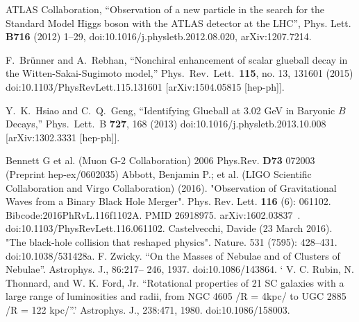 \begin{thebibliography}{9}
 ATLAS Collaboration,
  “Observation of a new particle in the search for the Standard Model Higgs boson with the ATLAS detector at the LHC”, 
 Phys. Lett. {\bf B716} (2012) 1–29, doi:10.1016/j.physletb.2012.08.020, arXiv:1207.7214.
 
 F.~Brünner and A.~Rebhan,
  ``Nonchiral enhancement of scalar glueball decay in the Witten-Sakai-Sugimoto model,''
  Phys.\ Rev.\ Lett.\  {\bf 115}, no. 13, 131601 (2015)
  doi:10.1103/PhysRevLett.115.131601
  [arXiv:1504.05815 [hep-ph]].
  
 Y.~K.~Hsiao and C.~Q.~Geng,
  ``Identifying Glueball at 3.02 GeV in Baryonic $B$ Decays,''
  Phys.\ Lett.\ B {\bf 727}, 168 (2013)
  doi:10.1016/j.physletb.2013.10.008
  [arXiv:1302.3331 [hep-ph]].
  
 Bennett G et al. 
 (Muon G-2 Collaboration) 2006 Phys.Rev. {\bf D73} 072003 
 (Preprint hep-ex/0602035)
Abbott, Benjamin P.; et al. (LIGO Scientific Collaboration and Virgo Collaboration) (2016). 
"Observation of Gravitational Waves from a Binary Black Hole Merger". Phys. Rev. Lett. {\bf 116} (6): 061102. 
Bibcode:2016PhRvL.116f1102A. PMID 26918975. arXiv:1602.03837  . 
doi:10.1103/PhysRevLett.116.061102.
 Castelvecchi, Davide (23 March 2016). 
 "The black-hole collision that reshaped physics". 
 Nature. 531 (7595): 428–431.
  doi:10.1038/531428a.
F. Zwicky. 
``On the Masses of Nebulae and of Clusters of Nebulae''.
 Astrophys. J., 86:217– 246, 1937. 
 doi:10.1086/143864.
 `%
  V. C. Rubin, N. Thonnard, and W. K. Ford, Jr. 
  ``Rotational properties of 21 SC galaxies with a large range of luminosities and radii, from NGC 4605 /R = 4kpc/ to UGC 2885 /R = 122 kpc/''.'
   Astrophys. J., 238:471, 1980. 
   doi:10.1086/158003.
 

\end{thebibliography}
